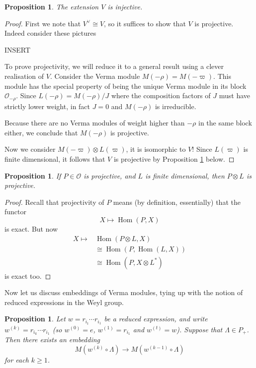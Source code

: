 \documentclass[12pt]{article}
\theoremstyle{plain}
\newtheorem{prop}[thm]{Proposition}
\theoremstyle{definition}
\numberwithin{equation}{section}
\DeclareMathOperator{\Hom}{Hom}
\newcommand{\La}{\Lambda}
\newcommand{\OO}{\mathcal{O}}
\begin{document}
\begin{prop}
The extension $V$ is injective.
\end{prop}

\begin{proof}
First we note that $V^\vee \cong V$, so it suffices to show that $V$ is projective. Indeed consider these pictures

INSERT


To prove projectivity, we will reduce it to a general result using a clever realisation of $V$. Consider the Verma module $M(-\rho) = M(-\varpi)$. This module has the special property of being the unique Verma module in its block $\OO_{-\rho}$. Since $L(-\rho) = M(-\rho) / J$ where the composition factors of $J$ must have strictly lower weight, in fact $J = 0$ and $M(-\rho)$ is irreducible.

Because there are no Verma modules of weight higher than $-\rho$ in the same block either, we conclude that $M(-\rho)$ is projective.

Now we consider $M(-\varpi) \otimes L(\varpi)$, it is isomorphic to $V$! Since $L(\varpi)$ is finite dimensional, it follows that $V$ is projective by Proposition \ref{prop:tensor.fin.dim} below.
\end{proof}


\begin{prop}\label{prop:tensor.fin.dim}
If $P \in \OO$ is projective, and $L$ is finite dimensional, then $P \otimes L$ is projective.
\end{prop}


\begin{proof}
Recall that projectivity of $P$ means (by definition, essentially) that the functor
\[
X \mapsto \Hom(P, X)
\]
is exact. But now
\begin{align*}
X \mapsto &\Hom(P \otimes L, X) \\
%
&\cong \Hom(P, \Hom(L, X)) \\
%
&\cong \Hom(P, X \otimes L^*)
\end{align*}
is exact too.
\end{proof}




Now let us discuss embeddings of Verma modules, tying up with the notion of reduced expressions in the Weyl group.
\begin{prop}\label{prop:length.embeddings}
Let $w = r_{i_t} \cdots r_{i_1}$ be a reduced expression, and write $w^{(k)} = r_{i_{k}} \cdots r_{i_1}$ (so $w^{(0)} = e$, $w^{(1)} = r_{i_1}$ and $w^{(t)} = w$). Suppose that $\La \in P_+$. Then there exists an embedding
\[
M(w^{(k)} \circ \La) \rightarrow M(w^{(k-1)} \circ \La)
\]
for each $k \geq 1$.
\end{prop}
\end{document}
